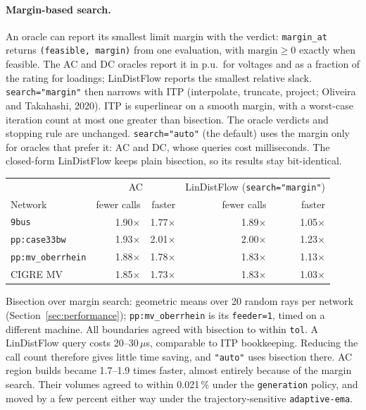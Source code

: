 \documentclass[11pt,a4paper]{report}
\newcommand{\code}[1]{\texttt{\small #1}}
\begin{document}
\paragraph{Margin-based search.} An oracle can report its smallest limit
margin with the verdict: \code{margin\_at} returns
\code{(feasible, margin)} from one evaluation, with $\text{margin} \ge 0$
exactly when feasible. The AC and DC oracles report it in p.u.\ for voltages
and as a fraction of the rating for loadings; LinDistFlow reports the smallest
relative slack. \code{search="margin"} then narrows with ITP (interpolate,
truncate, project; Oliveira and Takahashi, 2020). ITP is superlinear on a smooth
margin, with a worst-case iteration count at most one greater than bisection.
The oracle verdicts and stopping rule are unchanged. \code{search="auto"} (the
default) uses the margin only for oracles that prefer it: AC and DC, whose
queries cost milliseconds. The closed-form LinDistFlow keeps plain bisection, so
its results stay bit-identical.

\begin{center}\small
\begin{tabular}{@{}lrrrr@{}}
\toprule
& \multicolumn{2}{c}{AC} & \multicolumn{2}{c}{LinDistFlow (\code{search="margin"})} \\
Network & fewer calls & faster & fewer calls & faster \\
\midrule
\code{9bus}        & 1.90$\times$ & 1.77$\times$ & 1.89$\times$ & 1.05$\times$ \\
\code{pp:case33bw} & 1.93$\times$ & 2.01$\times$ & 2.00$\times$ & 1.23$\times$ \\
\code{pp:mv\_oberrhein} & 1.88$\times$ & 1.78$\times$ & 1.83$\times$ & 1.13$\times$ \\
CIGRE MV           & 1.85$\times$ & 1.73$\times$ & 1.83$\times$ & 1.03$\times$ \\
\bottomrule
\end{tabular}
\end{center}

\noindent Bisection over margin search: geometric means over 20 random rays
per network (Section~\ref{sec:performance}); \code{pp:mv\_oberrhein} is its
\code{feeder=1}, timed on a different machine.
All boundaries agreed with bisection to within \code{tol}. A LinDistFlow query
costs 20--30\,$\mu$s, comparable to ITP bookkeeping. Reducing the call count
therefore gives little time saving, and \code{"auto"} uses bisection there.
AC region builds became 1.7--1.9 times faster, almost entirely because of the
margin search. Their volumes agreed to within
0.021\,\% under the \code{generation} policy, and moved by a few percent either
way under the trajectory-sensitive \code{adaptive-ema}.
\end{document}
